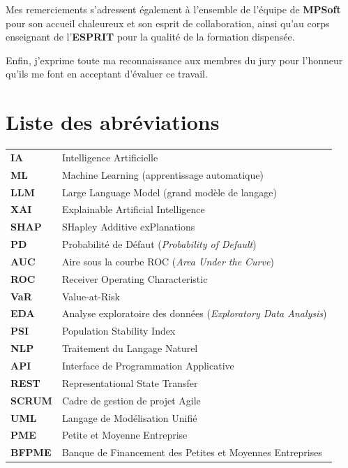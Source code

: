 \documentclass[a4paper,12pt,oneside]{report}
\begin{document}
Mes remerciements s'adressent également à l'ensemble de l'équipe de \textbf{MPSoft} pour son
accueil chaleureux et son esprit de collaboration, ainsi qu'au corps enseignant de l'\textbf{ESPRIT}
pour la qualité de la formation dispensée.

Enfin, j'exprime toute ma reconnaissance aux membres du jury pour l'honneur qu'ils me font en
acceptant d'évaluer ce travail.

{
  \renewcommand{\contentsname}{Table des matières}
  \tableofcontents
}

\chapter*{Liste des abréviations}
\thispagestyle{plain}
\begin{tabular}{ll}
  \textbf{IA}    & Intelligence Artificielle \\
  \textbf{ML}    & Machine Learning (apprentissage automatique) \\
  \textbf{LLM}   & Large Language Model (grand modèle de langage) \\
  \textbf{XAI}   & Explainable Artificial Intelligence \\
  \textbf{SHAP}  & SHapley Additive exPlanations \\
  \textbf{PD}    & Probabilité de Défaut (\textit{Probability of Default}) \\
  \textbf{AUC}   & Aire sous la courbe ROC (\textit{Area Under the Curve}) \\
  \textbf{ROC}   & Receiver Operating Characteristic \\
  \textbf{VaR}   & Value-at-Risk \\
  \textbf{EDA}   & Analyse exploratoire des données (\textit{Exploratory Data Analysis}) \\
  \textbf{PSI}   & Population Stability Index \\
  \textbf{NLP}   & Traitement du Langage Naturel \\
  \textbf{API}   & Interface de Programmation Applicative \\
  \textbf{REST}  & Representational State Transfer \\
  \textbf{SCRUM} & Cadre de gestion de projet Agile \\
  \textbf{UML}   & Langage de Modélisation Unifié \\
  \textbf{PME}   & Petite et Moyenne Entreprise \\
  \textbf{BFPME} & Banque de Financement des Petites et Moyennes Entreprises \\

\end{tabular}
\end{document}
